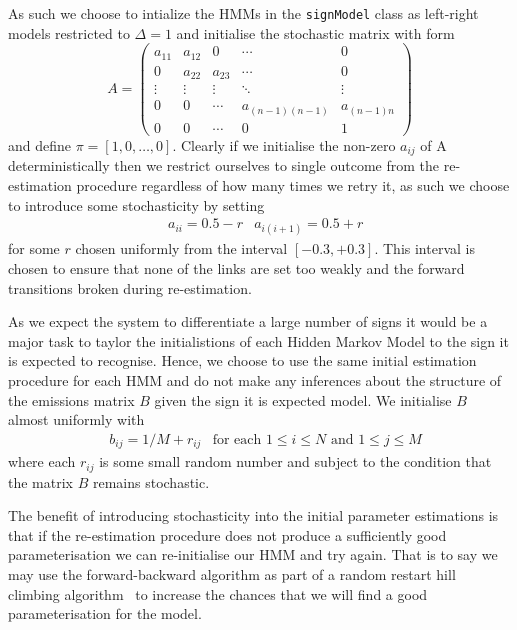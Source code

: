 As such we choose to intialize the HMMs in the \verb|signModel| class as left-right models restricted to $\Delta = 1$ and initialise the stochastic matrix with form
\begin{equation*}
A =
 \begin{pmatrix}
  a_{11} & a_{12} & 0 & \cdots & 0 \\
  0 & a_{22} & a_{23} &\cdots & 0 \\
  \vdots  & \vdots  & \vdots & \ddots & \vdots  \\
  0 & 0 & \cdots & a_{(n-1)(n-1)}& a_{(n-1)n} \\
  0 & 0 & \cdots & 0& 1
 \end{pmatrix}
\end{equation*}
and define $\pi = [1,0, \dots, 0]$. Clearly if we initialise the non-zero $a_{ij}$ of A deterministically then we restrict ourselves to single outcome from the re-estimation procedure regardless of how many times we retry it, as such we choose to introduce some stochasticity by setting
\begin{align*}
&a_{ii} = 0.5 - r &a_{i(i+1)} = 0.5 + r
\end{align*}
 for some $r$ chosen uniformly from the interval $[-0.3, +0.3]$. This interval is chosen to ensure that none of the links are set too weakly and the forward transitions broken during re-estimation.

As we expect the system to differentiate a large number of signs it would be a major task to taylor the initialistions of each Hidden Markov Model to the sign it is expected to recognise. Hence, we choose to use the same initial estimation procedure for each HMM and do not make any inferences about the structure of the emissions matrix $B$ given the sign it is expected model. We initialise $B$ almost uniformly with
\begin{align*}
&b_{ij} = 1/M + r_{ij} &\text{for each $1\leq i \leq N$ and $1 \leq j \leq M$}
\end{align*}
where each $r_{ij}$ is some small random number and subject to the condition that the matrix $B$ remains stochastic.

The benefit of introducing stochasticity into the initial parameter estimations is that if the re-estimation procedure does not produce a sufficiently good parameterisation we can re-initialise our HMM and try again. That is to say we may use the forward-backward algorithm as part of a random restart hill climbing algorithm~\citep{russell1995artificial} to increase the chances that we will find a good parameterisation for the model.

